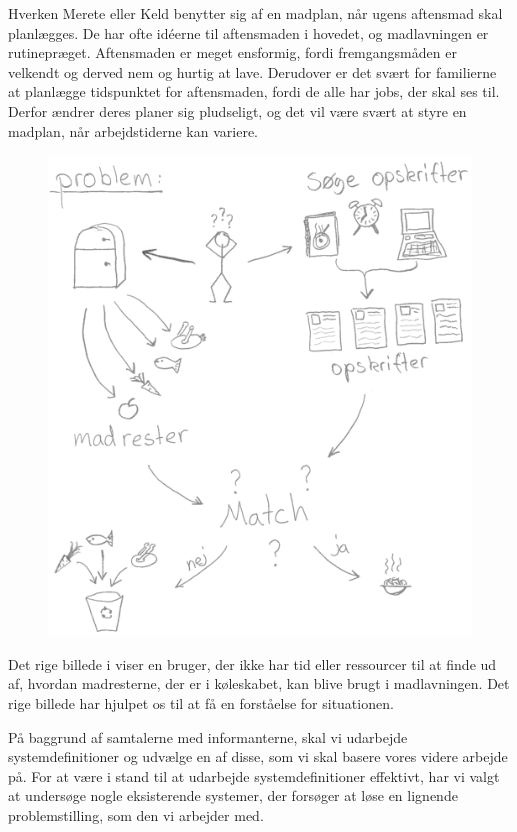 Hverken Merete eller Keld benytter sig af en madplan, når ugens aftensmad skal planlægges. De har ofte idéerne til aftensmaden i hovedet, og madlavningen er rutinepræget. Aftensmaden er meget ensformig, fordi fremgangsmåden er velkendt og derved nem og hurtig at lave. Derudover er det svært for familierne at planlægge tidspunktet for aftensmaden, fordi de alle har jobs, der skal ses til. Derfor ændrer deres planer sig pludseligt, og det vil være svært at styre en madplan, når arbejdstiderne kan variere.

\begin{figure}
\centering
\includegraphics[scale=0.6]{billeder/rigebilleder/problemomraade.png}
\label{fig:rigbillede1}
\end{figure}

Det rige billede i  viser en bruger, der ikke har tid eller ressourcer til at finde ud af, hvordan madresterne, der er i køleskabet, kan blive brugt i madlavningen. Det rige billede har hjulpet os til at få en forståelse for situationen.

På baggrund af samtalerne med informanterne, skal vi udarbejde systemdefinitioner og udvælge en af disse, som vi skal basere vores videre arbejde på. For at være i stand til at udarbejde systemdefinitioner effektivt, har vi valgt at undersøge nogle eksisterende systemer, der forsøger at løse en lignende problemstilling, som den vi arbejder med.